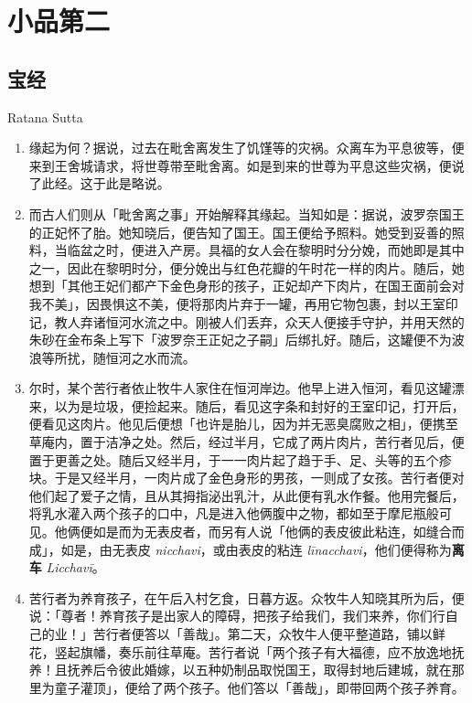 \chapter{小品第二}

\section{宝经}

\begin{center}Ratana Sutta\end{center}\vspace{1em}

\begin{enumerate}\item 缘起为何？据说，过去在毗舍离发生了饥馑等的灾祸。众离车为平息彼等，便来到王舍城请求，将世尊带至毗舍离。如是到来的世尊为平息这些灾祸，便说了此经。这于此是略说。
\item 而古人们则从「毗舍离之事」开始解释其缘起。当知如是：据说，波罗奈国王的正妃怀了胎。她知晓后，便告知了国王。国王便给予照料。她受到妥善的照料，当临盆之时，便进入产房。具福的女人会在黎明时分分娩，而她即是其中之一，因此在黎明时分，便分娩出与红色花瓣的午时花一样的肉片。随后，她想到「其他王妃们都产下金色身形的孩子，正妃却产下肉片，在国王面前会对我不美」，因畏惧这不美，便将那肉片弃于一罐，再用它物包裹，封以王室印记，教人弃诸恒河水流之中。刚被人们丢弃，众天人便接手守护，并用天然的朱砂在金布条上写下「波罗奈王正妃之子嗣」后绑扎好。随后，这罐便不为波浪等所扰，随恒河之水而流。
\item 尔时，某个苦行者依止牧牛人家住在恒河岸边。他早上进入恒河，看见这罐漂来，以为是垃圾，便捡起来。随后，看见这字条和封好的王室印记，打开后，便看见这肉片。他见后便想「也许是胎儿，因为并无恶臭腐败之相」，便携至草庵内，置于洁净之处。然后，经过半月，它成了两片肉片，苦行者见后，便置于更善之处。随后又经半月，于一一肉片起了趋于手、足、头等的五个疹块。于是又经半月，一肉片成了金色身形的男孩，一则成了女孩。苦行者便对他们起了爱子之情，且从其拇指泌出乳汁，从此便有乳水作餐。他用完餐后，将乳水灌入两个孩子的口中，凡是进入他俩腹中之物，都如至于摩尼瓶般可见。他俩便如是而为无表皮者，而另有人说「他俩的表皮彼此粘连，如缝合而成」，如是，由无表皮 \textit{nicchavi}，或由表皮的粘连 \textit{līnacchavi}，他们便得称为\textbf{离车} \textit{Licchavī}。
\item 苦行者为养育孩子，在午后入村乞食，日暮方返。众牧牛人知晓其所为后，便说：「尊者！养育孩子是出家人的障碍，把孩子给我们，我们来养，你们行自己的业！」苦行者便答以「善哉」。第二天，众牧牛人便平整道路，铺以鲜花，竖起旗幡，奏乐前往草庵。苦行者说「两个孩子有大福德，应不放逸地抚养！且抚养后令彼此婚嫁，以五种奶制品取悦国王，取得封地后建城，就在那里为童子灌顶」，便给了两个孩子。他们答以「善哉」，即带回两个孩子养育。

\end{enumerate}
